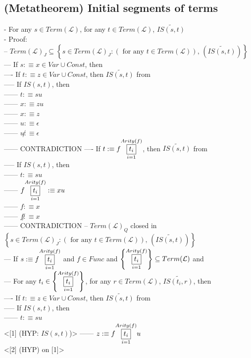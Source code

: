 \documentclass{book}
\newcommand{\is}{:\equiv}
\newcommand{\pnot}[1]{\widetilde{#1}}
\newcommand{\inot}{\not}
\newcommand{\txtforall}[2]{\left(\text{ for any }#1\right)\text{, }\left(#2\right)}
\newcommand{\set}[1]{\left\{ #1 \right\}}
\newcommand{\vdc}[3]{\underset{#2}{\overset{#3}{\fbox{$#1$}}}}
\begin{document}
\subsection{(Metatheorem) Initial segments of terms} %
	- For any $s \in Term(\mathcal{L})$, for any $t \in Term(\mathcal{L})$, $\pnot{IS(s, t)}$ \\
	- Proof: \\
		-- $Term(\mathcal{L})_J \subseteq \set{s \in Term(\mathcal{L})_J: \txtforall{t \in Term(\mathcal{L})}{\pnot{IS(s, t)}}}$ \\
			--- If $s \is x \in Var \cup Const$, then \\
				---- If $t \is z \in Var \cup Const$, then $\pnot{IS(s, t)}$ from \\
					----- If $IS(s, t)$, then \\
						------ $t \is s u$ \\
						------ $x \is z u$ \\
						------ $x \is z$ \\
						------ $u \is \epsilon$ \\
						------ $u \inot \is \epsilon$ \\
						------ CONTRADICTION
				---- If $t \is f \vdc{t_i}{i=1}{Arity(f)}$, then $\pnot{IS(s, t)}$ from \\
					----- If $IS(s, t)$, then \\
						------ $t \is s u$ \\
						------ $f \vdc{t_i}{i=1}{Arity(f)} \is x u$ \\
						------ $f \is x$ \\
						------ $f \inot \is x$ \\
						------ CONTRADICTION
		-- $Term(\mathcal{L})_Q$ closed in $\set{s \in Term(\mathcal{L})_J: \txtforall{t \in Term(\mathcal{L})}{\pnot{IS(s, t)}}}$ \\
			--- If $s \is f \vdc{t_i}{i=1}{Arity(f)}$ and $f \in Func$ and $\set{\vdc{t_i}{i=1}{Arity(f)}} \subseteq Term(\mathcal{L})$ and \\
			--- For any $t_i \in \set{\vdc{t_i}{i=1}{Arity(f)}}$, for any $r \in Term(\mathcal{L})$, $\pnot{IS(t_i, r)}$, then \\
				---- If $t \is z \in Var \cup Const$, then $\pnot{IS(s, t)}$ from \\
					----- If $IS(s, t)$, then \\
						------ $t \is s u$ \\ <[1] (HYP: $IS(s, t)$)>
						------ $z \is f \vdc{t_i}{i=1}{Arity(f)} u$ \\ <[2] (HYP) on [1]>
\end{document}
